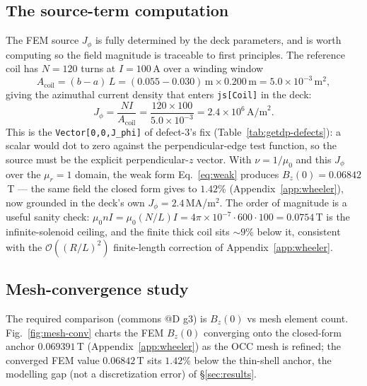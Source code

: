 \subsection{The source-term computation}
\label{app:getdp-source}

The FEM source $J_\phi$ is fully determined by the deck parameters, and is
worth computing so the field magnitude is traceable to first principles.
The reference coil has $N=120$ turns at $I=100$\,A over a winding window
\begin{equation}
A_{\text{coil}} = (b-a)\,L = (0.055-0.030)\,\text{m}\times0.200\,\text{m}
  = 5.0\times10^{-3}\,\text{m}^2,
\end{equation}
giving the azimuthal current density that enters \texttt{js[Coil]} in the
deck:
\begin{equation}
J_\phi = \frac{NI}{A_{\text{coil}}}
  = \frac{120\times100}{5.0\times10^{-3}}
  = 2.4\times10^{6}\,\text{A/m}^2.
\label{eq:jphi}
\end{equation}
This is the \texttt{Vector[0,0,J\_phi]} of defect-3's fix
(Table~\ref{tab:getdp-defects}): a scalar would dot to zero against the
perpendicular-edge test function, so the source must be the explicit
perpendicular-$z$ vector. With $\nu=1/\mu_0$ and this $J_\phi$ over the
$\mu_r\!=\!1$ domain, the weak form Eq.~\eqref{eq:weak} produces
$B_z(0)=0.06842$\,T --- the same field the closed form gives to $1.42$\%
(Appendix~\ref{app:wheeler}), now grounded in the deck's own
$J_\phi=2.4$\,MA/m$^2$. The order of magnitude is a useful sanity check:
$\mu_0 nI = \mu_0(N/L)I = 4\pi\!\times\!10^{-7}\cdot600\cdot100
= 0.0754$\,T is the infinite-solenoid ceiling, and the finite thick coil
sits $\sim\!9$\% below it, consistent with the $\mathcal{O}((R/L)^2)$
finite-length correction of Appendix~\ref{app:wheeler}.

\subsection{Mesh-convergence study}
\label{app:getdp-mesh}

The required comparison (commons @D g3) is $B_z(0)$ vs mesh element count.
Fig.~\ref{fig:mesh-conv} charts the FEM $B_z(0)$ converging onto the
closed-form anchor $0.069391$\,T (Appendix~\ref{app:wheeler}) as the OCC
mesh is refined; the converged FEM value $0.06842$\,T sits $1.42$\% below
the thin-shell anchor, the modelling gap (not a discretization error) of
\S\ref{sec:results}.

